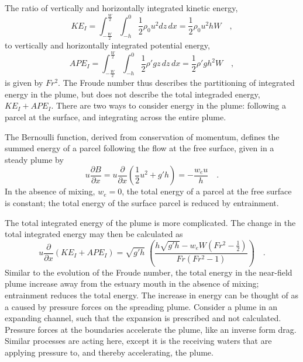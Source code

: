 \documentclass[12pt]{article}
\begin{document}
The ratio of vertically and horizontally integrated kinetic energy, 
\begin{equation}
    KE_I = \int_{-\frac{W}{2}}^{\frac{W}{2}} \int_{-h}^{0} \frac{1}{2} \rho_0 u^2 dz \, dx = \frac{1}{2} \rho_0 u^2 h W \quad ,
\end{equation} 
to vertically and horizontally integrated potential energy, 
\begin{equation}
    APE_I = \int_{-\frac{W}{2}}^{\frac{W}{2}} \int_{-h}^{0} \frac{1}{2} \rho' g z\, dz \,dx = \frac{1}{2} \rho' g h^2 W \quad ,
\end{equation}
is given by $Fr^2$. The Froude number thus describes the partitioning of integrated energy in the plume, but does not describe the total integraded energy, $KE_I + APE_I$. There are two ways to consider energy in the plume: following a parcel at the surface, and integrating across the entire plume. 

The Bernoulli function, derived from conservation of momentum, defines the summed energy of a parcel following the flow at the free surface, given in a steady plume by
\begin{equation}
    u \frac{\partial B}{\partial x} = u \frac{\partial }{\partial x}\left( \frac{1}{2} u^2 + g' h\right) = -\frac{w_e u}{h} \quad .
\end{equation}
In the absence of mixing, $w_e = 0$, the total energy of a parcel at the free surface is constant; the total energy of the surface parcel is reduced by entrainment. 

The total integrated energy of the plume is more complicated. The change in the total integrated energy may then be calculated as
\begin{equation}
    u \frac{\partial}{\partial x} \left( KE_I + APE_I \right) = \sqrt{g' h}\; \left( \frac{h \sqrt{g' h} - w_e W (Fr^2 - \frac{1}{2})}{Fr(Fr^2 - 1)}\right) \quad .
\end{equation}
Similar to the evolution of the Froude number, the total energy in the near-field plume increase away from the estuary mouth in the absence of mixing; entrainment reduces the total energy. The increase in energy can be thought of as a caused by pressure forces on the spreading plume. Consider a plume in an expanding channel, such that the expansion is prescribed and not calculated. Pressure forces at the boundaries accelerate the plume, like an inverse form drag. Similar processes are acting here, except it is the receiving waters that are applying pressure to, and thereby accelerating, the plume. 
\end{document}
